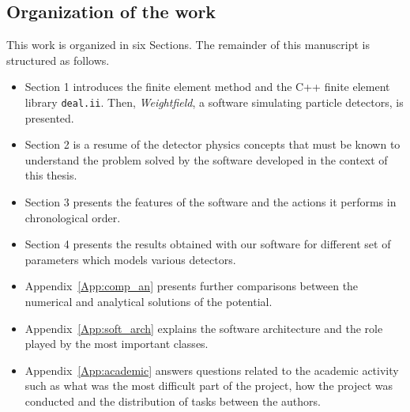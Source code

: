 \documentclass[11pt]{article}
\begin{document}

	\subsection*{Organization of the work}

		This work is organized in six Sections. The remainder of this manuscript
		is structured as follows.

		\begin{itemize}
			\item Section 1 introduces the finite element method and the
			C++ finite element library \texttt{deal.ii}. Then, \textit{Weightfield},
			a software simulating particle detectors, is presented.
			\item Section 2 is a resume of the detector physics concepts that must be
			known to understand the problem solved by the software developed in the
			context of this thesis.
			\item Section 3 presents the features of the software and the actions
			it performs in chronological order.

			\item Section 4 presents the results obtained with our software for
			different set of parameters which models various detectors.

			\item Appendix~\ref{App:comp_an} presents further comparisons between
			the numerical and analytical solutions of the potential.

			\item Appendix~\ref{App:soft_arch} explains the software architecture and the role played by
			the most important classes.

			\item Appendix~\ref{App:academic} answers questions related to the
			academic activity such as what was
			the most difficult part of the project, how the project was conducted
			and the distribution of tasks between the authors.

		\end{itemize}

\end{document}
